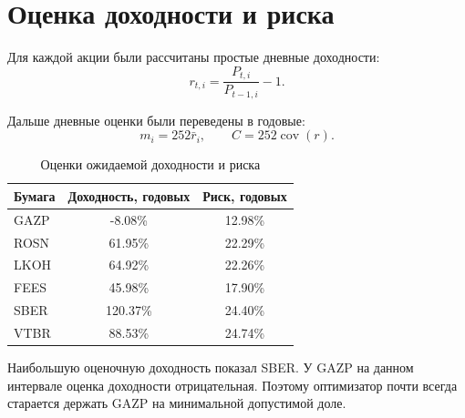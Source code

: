 \documentclass[12pt,a4paper]{article}
\begin{document}
\section{Оценка доходности и риска}

Для каждой акции были рассчитаны простые дневные доходности:
\[
r_{t,i} = \frac{P_{t,i}}{P_{t-1,i}} - 1.
\]

Дальше дневные оценки были переведены в годовые:
\[
m_i = 252\bar r_i, \qquad C = 252\operatorname{cov}(r).
\]

\begin{table}[H]
    \centering
    \caption{Оценки ожидаемой доходности и риска}
    \begin{tabular}{lcc}
        \toprule
        Бумага & Доходность, годовых & Риск, годовых \\
        \midrule
        GAZP & -8.08\% & 12.98\% \\
        ROSN & 61.95\% & 22.29\% \\
        LKOH & 64.92\% & 22.26\% \\
        FEES & 45.98\% & 17.90\% \\
        SBER & 120.37\% & 24.40\% \\
        VTBR & 88.53\% & 24.74\% \\
        \bottomrule
    \end{tabular}
\end{table}

Наибольшую оценочную доходность показал SBER. У GAZP на данном интервале оценка доходности отрицательная. Поэтому оптимизатор почти всегда старается держать GAZP на минимальной допустимой доле.

\begin{table}[H]
    \centering
    \small
    \caption{Годовая ковариационная матрица}
\end{table}
\end{document}
